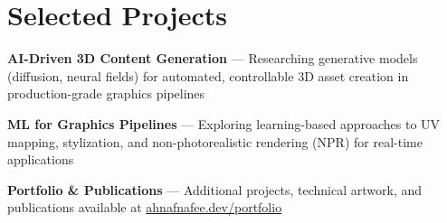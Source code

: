\documentclass[letterpaper,10pt]{article}
\begin{document}
\section*{Selected Projects}
\begin{tightitemize}
\item \textbf{AI-Driven 3D Content Generation} --- Researching generative models (diffusion, neural fields) for automated, controllable 3D asset creation in production-grade graphics pipelines
\item \textbf{ML for Graphics Pipelines} --- Exploring learning-based approaches to UV mapping, stylization, and non-photorealistic rendering (NPR) for real-time applications
\item \textbf{Portfolio \& Publications} --- Additional projects, technical artwork, and publications available at \href{https://www.ahnafnafee.dev/portfolio}{ahnafnafee.dev/portfolio}
\end{tightitemize}
\end{document}
